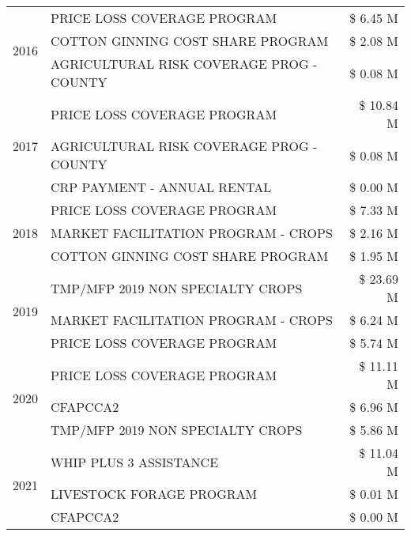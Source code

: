 \begin{tabular}{llr}
\cline{1-3}
\multirow[t]{3}{*}{2016} & PRICE LOSS COVERAGE PROGRAM & \$ 6.45 M \\
 & COTTON GINNING COST SHARE PROGRAM & \$ 2.08 M \\
 & AGRICULTURAL RISK COVERAGE PROG - COUNTY & \$ 0.08 M \\
\cline{1-3}
\multirow[t]{3}{*}{2017} & PRICE LOSS COVERAGE PROGRAM & \$ 10.84 M \\
 & AGRICULTURAL RISK COVERAGE PROG - COUNTY & \$ 0.08 M \\
 & CRP PAYMENT - ANNUAL RENTAL & \$ 0.00 M \\
\cline{1-3}
\multirow[t]{3}{*}{2018} & PRICE LOSS COVERAGE PROGRAM & \$ 7.33 M \\
 & MARKET FACILITATION PROGRAM - CROPS & \$ 2.16 M \\
 & COTTON GINNING COST SHARE PROGRAM & \$ 1.95 M \\
\cline{1-3}
\multirow[t]{3}{*}{2019} & TMP/MFP 2019 NON SPECIALTY CROPS & \$ 23.69 M \\
 & MARKET FACILITATION PROGRAM - CROPS & \$ 6.24 M \\
 & PRICE LOSS COVERAGE PROGRAM & \$ 5.74 M \\
\cline{1-3}
\multirow[t]{3}{*}{2020} & PRICE LOSS COVERAGE PROGRAM & \$ 11.11 M \\
 & CFAPCCA2 & \$ 6.96 M \\
 & TMP/MFP 2019 NON SPECIALTY CROPS & \$ 5.86 M \\
\cline{1-3}
\multirow[t]{3}{*}{2021} & WHIP PLUS 3 ASSISTANCE & \$ 11.04 M \\
 & LIVESTOCK FORAGE PROGRAM & \$ 0.01 M \\
 & CFAPCCA2 & \$ 0.00 M \\
\cline{1-3}
\bottomrule
\end{tabular}
